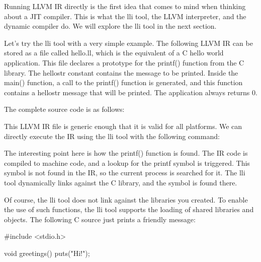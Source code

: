 


Running LLVM IR directly is the first idea that comes to mind when thinking about a JIT compiler.
This is what the lli tool, the LLVM interpreter, and the dynamic compiler do. We will explore the lli tool in the next section.



Let’s try the lli tool with a very simple example. The following LLVM IR can be stored as a file called hello.ll, which is the equivalent of a C hello world application. This file declares a prototype for the printf() function from the C library. The hellostr constant contains the message to be printed. Inside the main() function, a call to the printf() function is generated, and this function contains a hellostr message that will be printed. The application always returns 0.

The complete source code is as follows:


This LLVM IR file is generic enough that it is valid for all platforms. We can directly execute the IR using the lli tool with the following command:


The interesting point here is how the printf() function is found. The IR code is compiled to machine code, and a lookup for the printf symbol is triggered. This symbol is not found in the IR, so the current process is searched for it. The lli tool dynamically links against the C library, and the symbol is found there.

Of course, the lli tool does not link against the libraries you created. To enable the use of such functions, the lli tool supports the loading of shared libraries and objects. The following C source just prints a friendly message:

\begin{shell}
#include <stdio.h>

void greetings() {
    puts("Hi!");
}
\end{shell}


